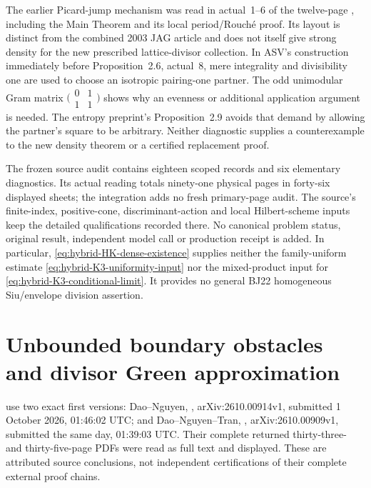 The earlier Picard-jump mechanism was read in actual~1--6
of the twelve-page \cite{Oguiso00PicardV1}, including the
Main Theorem and its local period/Rouch\'e proof. Its layout
is distinct from the combined 2003 JAG article and does
not itself give strong density for the new prescribed
lattice-divisor collection. In ASV's construction immediately
before Proposition~2.6, actual~8, mere integrality and
divisibility one are used to choose an isotropic pairing-one
partner. The odd unimodular Gram matrix
$\bigl(\begin{smallmatrix}0&1\\1&1\end{smallmatrix}\bigr)$
shows why an evenness or additional application argument is
needed. The entropy preprint's Proposition~2.9 avoids that
demand by allowing the partner's square to be arbitrary.
Neither diagnostic supplies a counterexample to the new
density theorem or a certified replacement proof.

The frozen source audit contains eighteen scoped records
and six elementary diagnostics. Its actual reading totals
ninety-one physical pages in forty-six displayed sheets;
the integration adds no fresh primary-page audit. The
source's finite-index, positive-cone, discriminant-action
and local Hilbert-scheme inputs keep the detailed qualifications
recorded there. No canonical problem status, original result,
independent model call or production receipt is added.
In particular, \eqref{eq:hybrid-HK-dense-existence} supplies
neither the family-uniform estimate
\eqref{eq:hybrid-K3-uniformity-input} nor the mixed-product
input for \eqref{eq:hybrid-K3-conditional-limit}. It provides
no general BJ22 homogeneous Siu/envelope division assertion.

\section{Unbounded boundary obstacles and divisor Green approximation}
\label{sec:provenance-boundary-envelopes}

use two exact first versions: Dao--Nguyen,
\cite{DaoNguyen26UnboundedDirichletV1}, arXiv:2610.00914v1,
submitted 1 October 2026, 01:46:02 UTC; and Dao--Nguyen--Tran,
\cite{DaoNguyenTran26HypersurfaceGreenV1}, arXiv:2610.00909v1,
submitted the same day, 01:39:03 UTC. Their complete returned
thirty-three- and thirty-five-page PDFs were read as full text and
displayed. These are attributed source conclusions, not independent
certifications of their complete external proof chains.

